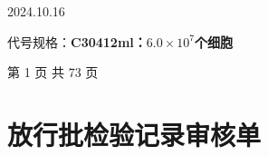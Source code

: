 \documentclass[UTF8,10pt,a4paper,fontset=fandol]{ctexart}
\newcommand{\handwritten}[1]{#1}
\begin{document}
\handwritten{2024.10.16}

\vspace{1.5em}

\noindent
代号规格：\underline{\hspace{3.5cm}}\textbf{C304\quad 12ml：$6.0\times10^{7}$个细胞}

\vfill

\begin{center}
第 1 页 共 73 页
\end{center}

\newpage

\section*{放行批检验记录审核单}
\end{document}
